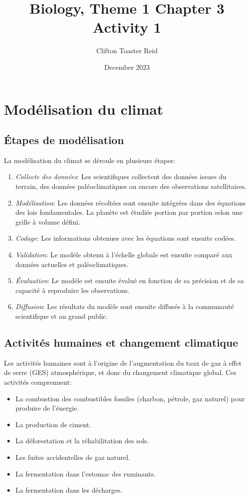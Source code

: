 \documentclass{article}
\title{Biology, Theme 1 Chapter 3 Activity 1}
\author{Clifton Toaster Reid}
\date{December 2023}
\begin{document}
\maketitle

\section{Modélisation du climat}

\subsection{Étapes de modélisation}

La modélisation du climat se déroule en plusieurs étapes:

\begin{enumerate}
\item \textit{Collecte des données}: Les scientifiques collectent des données issues du terrain, des données paléoclimatiques ou encore des observations satellitaires.
\item \textit{Modélisation}: Les données récoltées sont ensuite intégrées dans des équations des lois fondamentales. La planète est étudiée portion par portion selon une grille à volume défini.
\item \textit{Codage}: Les informations obtenues avec les équations sont ensuite codées.
\item \textit{Validation}: Le modèle obtenu à l'échelle globale est ensuite comparé aux données actuelles et paléoclimatiques.
\item \textit{Évaluation}: Le modèle est ensuite évalué en fonction de sa précision et de sa capacité à reproduire les observations.
\item \textit{Diffusion}: Les résultats du modèle sont ensuite diffusés à la communauté scientifique et au grand public.
\end{enumerate}

\subsection{Activités humaines et changement climatique}

Les activités humaines sont à l'origine de l'augmentation du taux de gaz à effet de serre (GES) atmosphérique, et donc du changement climatique global. Ces activités comprennent:

\begin{itemize}
\item La combustion des combustibles fossiles (charbon, pétrole, gaz naturel) pour produire de l'énergie.
\item La production de ciment.
\item La déforestation et la réhabilitation des sols.
\item Les fuites accidentelles de gaz naturel.
\item La fermentation dans l'estomac des ruminants.
\item La fermentation dans les décharges.
\end{itemize}
\end{document}
